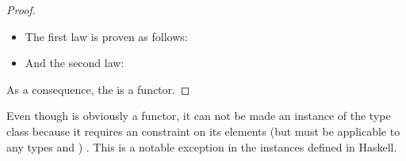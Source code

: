 \begin{example}
\begin{verbatim}
\end{verbatim}

  \begin{proof}

    \hfill
    \begin{itemize}
    \item
      The first law is proven as follows:
      \begin{steps}
      \end{steps}
    \item
      And the second law:
      \begin{steps}
      \end{steps}
    \end{itemize}
    As a consequence, the  is a functor.

  \end{proof}

\end{example}

\begin{remark}

  Even though  is obviously a functor, it can not be made
  an instance of the  type class because it requires
  an  constraint on its elements (but  must
  be applicable to any types  and )
  \parencite{yorgey-2009}. This is a notable exception in the
  instances defined in Haskell.


\end{remark}

\begin{example}


\end{example}

